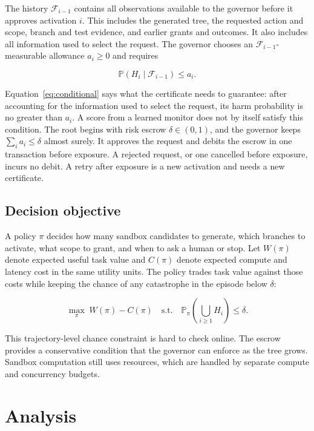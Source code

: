 \documentclass[sigconf,nonacm]{acmart}
\newcommand{\Prb}{\mathbb{P}}
\newcommand{\F}{\mathcal{F}}
\begin{document}
The history $\F_{i-1}$ contains all observations available to the governor before it approves
activation $i$.  This includes the generated tree, the requested action and scope, branch and test
evidence, and earlier grants and outcomes.  It also includes all information used to select the
request.  The governor
chooses an $\F_{i-1}$-measurable allowance $a_i\geq0$ and requires

\begin{equation}
 \Prb(H_i\mid \F_{i-1})\leq a_i .
 \label{eq:conditional}
\end{equation}

Equation~\eqref{eq:conditional} says what the certificate needs to guarantee: after accounting
for the information used to select the request, its harm probability is no greater than $a_i$.
A score from a learned monitor does not by itself satisfy this condition.  The root begins with
risk escrow $\delta\in(0,1)$, and the governor keeps $\sum_i a_i\leq\delta$ almost surely.  It approves the
request and debits the escrow in one transaction before exposure.  A rejected request, or one
cancelled before exposure, incurs no debit.  A retry after exposure is a new activation and needs
a new certificate.

\subsection{Decision objective}

A policy $\pi$ decides how many sandbox candidates to generate, which branches to activate, what
scope to grant, and when to ask a human or stop.  Let $W(\pi)$ denote expected useful task value
and $C(\pi)$ denote expected compute and latency cost in the same utility units.  The policy trades
task value against those costs while keeping the chance of any catastrophe in
the episode below $\delta$:

\[
 \max_{\pi}\; W(\pi)-C(\pi)
 \quad\text{s.t.}\quad
 \Prb_{\pi}\!\left(\bigcup_{i\geq1}H_i\right)\leq\delta .
\]

This trajectory-level chance constraint is hard to check online.  The escrow provides a
conservative condition that the governor can enforce as the tree grows.  Sandbox computation
still uses resources, which are handled by separate compute and concurrency budgets.

\section{Analysis}
\end{document}
